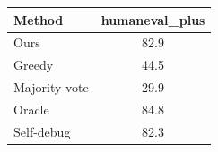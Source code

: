 \begin{tabular}{lc}
\toprule
Method & humaneval_plus \\
\midrule
Ours & 82.9 \\
Greedy & 44.5 \\
Majority vote & 29.9 \\
Oracle & 84.8 \\
Self-debug & 82.3 \\
\bottomrule
\end{tabular}
